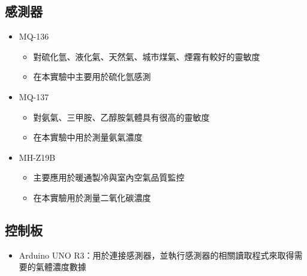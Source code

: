	\subsection{感測器}
	\begin{itemize}
		\item MQ-136 \begin{itemize}
			\item 對硫化氫、液化氣、天然氣、城市煤氣、煙霧有較好的靈敏度
			\item 在本實驗中主要用於硫化氫感測
		\end{itemize}
		\item MQ-137 \begin{itemize}
			\item 對氨氣、三甲胺、乙醇胺氣體具有很高的靈敏度
			\item 在本實驗中用於測量氨氣濃度
		\end{itemize}
		\item MH-Z19B \begin{itemize}
			\item 主要應用於暖通製冷與室內空氣品質監控
			\item 在本實驗用於測量二氧化碳濃度
		\end{itemize}
	\end{itemize}
	\subsection{控制板}
	\begin{itemize}
		\item Arduino UNO R3：用於連接感測器，並執行感測器的相關讀取程式來取得需要的氣體濃度數據
	\end{itemize}
